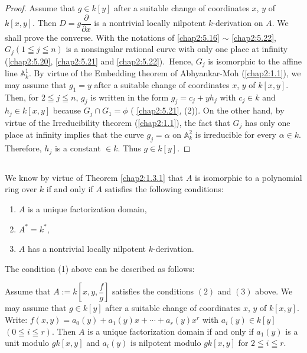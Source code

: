 \begin{proof}
Assume that $g\in k[y]$ after a suitable change of coordinates $x$,
$y$ of $k[x,y]$. Then $D=g\dfrac{\partial}{\partial x}$ is a
nontrivial locally nilpotent $k$-derivation on $A$. We shall prove the
converse. With the notations of \ref{chap2:5.16} $\sim$ \ref{chap2:5.22},
$G_{j}(1\leqq j\leqq n)$ is a nonsingular rational curve with only one
place at infinity (\cf \ref{chap2:5.20}, \ref{chap2:5.21} and
\ref{chap2:5.22}).\pageoriginale\ Hence, $G_{j}$ is isomorphic to the affine
line $\mathbb{A}^{1}_{k}$. By virtue of the Embedding theorem of
Abhyankar-Moh (\cf \ref{chap2:1.1}), we may assume that $g_{1}=y$ after a
suitable change of coordinates $x$, $y$ of $k[x,y]$. Then, for $2\leqq
j\leqq n$, $g_{j}$ is written in the form $g_{j}=c_{j}+yh_{j}$ with
$c_{j}\in k$ and $h_{j}\in k[x,y]$ because $G_{j}\cap G_{1}=\phi$ (\cf
\ref{chap2:5.21}, (2)). On the other hand, by virtue of the Irreducibility
theorem (\cf \ref{chap2:1.1}), the fact that $G_{j}$ has only one place at
infinity implies that the curve $g_{j}=\alpha$ on $\mathbb{A}^{2}_{k}$
is irreducible for every $\alpha\in k$. Therefore, $h_{j}$ is a
constant $\in k$. Thus $g\in k[y]$.
\end{proof}

\subsection{}\label{chap2:5.24}
We know by virtue of Theorem \ref{chap2:1.3.1} that $A$ is isomorphic to a
polynomial ring over $k$ if and only if $A$ satisfies the following
conditions:
\begin{enumerate}
\renewcommand{\labelenumi}{(\theenumi)}
\item $A$ is a unique factorization domain,

\item $A^{\ast}=k^{\ast}$,

\item $A$ has a nontrivial locally nilpotent $k$-derivation.
\end{enumerate}
The condition (1) above can be described as follows:

\begin{lemma*}
Assume that $A:=k[x,y,\dfrac{f}{g}]$ satisfies the conditions $(2)$
and $(3)$ above. We may assume that $g\in k[y]$ after a suitable
change of coordinates $x$, $y$ of $k[x,y]$. Write:
$f(x,y)=a_{0}(y)+a_{1}(y)x+\cdots+a_{r}(y)x^{r}$ with $a_{i}(y)\in
k[y]$ $(0\leqq i\leqq r)$. Then $A$ is a unique factorization domain
if and only if $a_{1}(y)$ is a unit modulo $gk[x,y]$ and $a_{i}(y)$ is
nilpotent modulo $gk[x,y]$ for $2\leqq i\leqq r$.
\end{lemma*}

